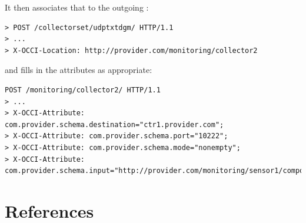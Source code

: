 \documentclass[12pt]{article}  %
\begin{document}
{\begin{table}
\caption{Attributes defined for the {\tt udptxtdgm} mixin \label{tab:udp}}
\end {table}

It then associates that \mi to the outgoing \coll:

{\scriptsize
\begin{verbatim}
> POST /collectorset/udptxtdgm/ HTTP/1.1
> ...
> X-OCCI-Location: http://provider.com/monitoring/collector2
\end{verbatim}
 }
and fills in the attributes as appropriate:

\begin{verbatim}
POST /monitoring/collector2/ HTTP/1.1
> ...
> X-OCCI-Attribute: com.provider.schema.destination="ctr1.provider.com";
> X-OCCI-Attribute: com.provider.schema.port="10222";
> X-OCCI-Attribute: com.provider.schema.mode="nonempty";
> X-OCCI-Attribute: com.provider.schema.input="http://provider.com/monitoring/sensor1/compoutput";
\end{verbatim}




\section{References}

\renewcommand{\refname}{}
\vspace*{-3em}



}
\end{document}

